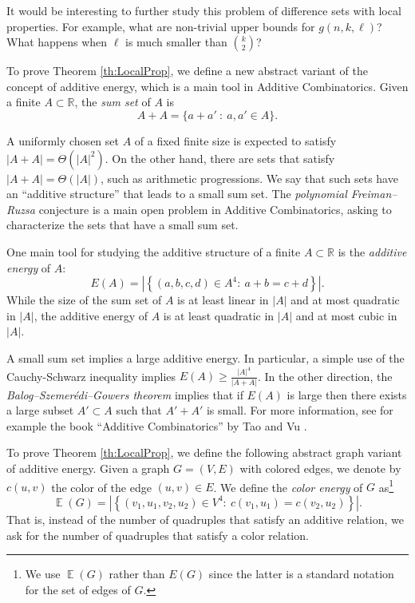 \documentclass[11pt]{article}
\newcommand{\parag}[1]{\vspace{2mm}

\noindent{\bf #1} }
\newcommand{\RR}{\ensuremath{\mathbb R}}
\DeclareMathOperator*{\EE}{\mathbb{E}}
\begin{document}
It would be interesting to further study this problem of difference sets with local properties.
For example, what are non-trivial upper bounds for $g(n,k,\ell)$? What happens when $\ell$ is much smaller than $\binom{k}{2}$?

\parag{Our proof technique.}
To prove Theorem \ref{th:LocalProp}, we define a new abstract variant of the concept of additive energy, which is a main tool in Additive Combinatorics.
Given a finite $A\subset \RR$, the \emph{sum set} of $A$ is
%
\[ A+A = \{a+a'\ :\ a,a'\in A \}. \]

A uniformly chosen set $A$ of a fixed finite size is expected to satisfy $|A+A|=\Theta(|A|^2)$.
On the other hand, there are sets that satisfy $|A+A|=\Theta(|A|)$, such as arithmetic progressions.
We say that such sets have an ``additive structure'' that leads to a small sum set.
The \emph{polynomial Freiman--Ruzsa }conjecture is a main open problem in Additive Combinatorics, asking to characterize the sets that have a small sum set.

One main tool for studying the additive structure of a finite $A\subset \RR$ is the \emph{additive energy} of $A$:
%
\[ E(A) = \left|\left\{(a,b,c,d)\in A^4 :\ a+b=c+d\right\}\right|. \]
%
While the size of the sum set of $A$ is at least linear in $|A|$ and at most quadratic in $|A|$, the additive energy of $A$ is at least quadratic in $|A|$ and at most cubic in $|A|$.

A small sum set implies a large additive energy.
In particular, a simple use of the Cauchy-Schwarz inequality implies $E(A)\ge \frac{|A|^4}{|A+A|}$.
In the other direction, the \emph{Balog--Szemer\'edi--Gowers theorem} implies that if $E(A)$ is large then there exists a large subset $A'\subset A$ such that $A'+A'$ is small.
For more information, see for example the book ``Additive Combinatorics'' by Tao and Vu \cite{TV06}.

To prove Theorem \ref{th:LocalProp}, we define the following abstract graph variant of additive energy.
Given a graph $G=(V,E)$ with colored edges, we denote by $c(u,v)$ the color of the edge $(u,v)\in E$.
We define the \emph{color energy} of $G$ as\footnote{We use $\EE(G)$ rather than $E(G)$ since the latter is a standard notation for the set of edges of $G$.}
%
\begin{equation*}
\EE(G) = \left|\left\{(v_1,u_1,v_2,u_2)\in V^{4} :\ c(v_1,u_1) = c(v_2,u_2)\right\}\right|.
\end{equation*}
%
That is, instead of the number of quadruples that satisfy an additive relation, we ask for the number of quadruples that satisfy a color relation.
\end{document}
